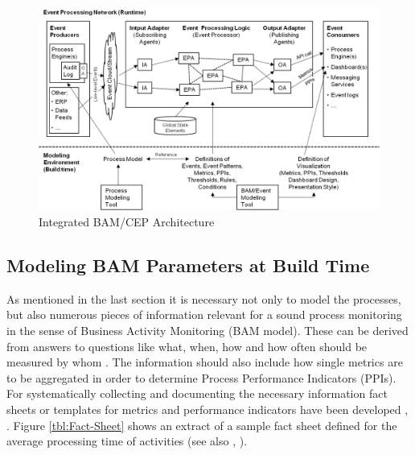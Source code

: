 \begin{figure}[htbp]
	\centering
	\includegraphics[width=0.9\linewidth]{Figures/Chapter5/Monitoring/Integrated-BAM-CEP-Architecture-27.jpg}
	\caption[Integrated BAM/CEP Architecture 27]{Integrated BAM/CEP Architecture \cite{book:processmonitoring}}
	\label{fig:BAMArchitecture}
\end{figure}



\subsection{Modeling BAM Parameters at Build Time}
As mentioned in the last section it is necessary not only to model the processes, but also numerous pieces of information relevant for a sound process monitoring in the sense of Business Activity Monitoring (BAM model). These can be derived from answers to questions like what, when, how and how often should be measured by whom \cite{book:ProzesseSchmelzer}. The information should also include how single metrics are to be aggregated in order to determine Process Performance Indicators (PPIs). For systematically collecting and documenting the necessary information fact sheets or templates for metrics and performance indicators have been developed \cite{book:KennzahlenIT}, \cite{book:ITControlling}. Figure \ref{tbl:Fact-Sheet}  shows an extract of a sample fact sheet defined for the average processing time of activities (see also \cite{article:SBPMCosting}, \cite{book:MonitoringSubjekt} ).


